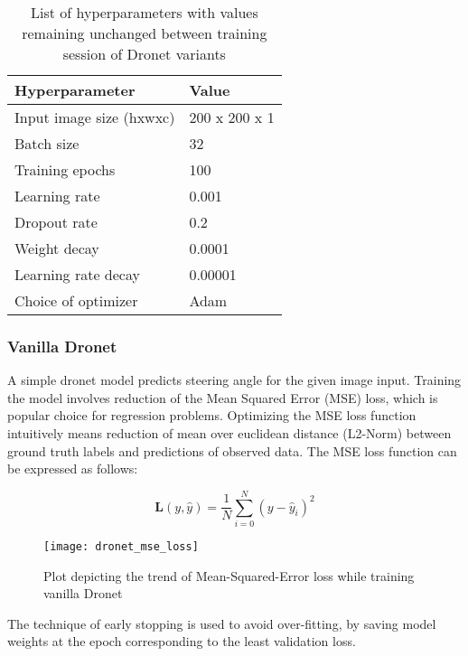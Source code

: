 \begin{table}[h]
	\centering
	\begin{tabular}{|l|l|}
		\hline
		\textbf{Hyperparameter} & \textbf{Value} \\ \hline
		Input image size (hxwxc)& 200 x 200 x 1  \\ \hline
		Batch size              & 32             \\ \hline
		Training epochs         & 100            \\ \hline
		Learning rate           & 0.001          \\ \hline
		Dropout rate            & 0.2            \\ \hline
		Weight decay            & 0.0001         \\ \hline
		Learning rate decay     & 0.00001        \\ \hline
		Choice of optimizer     & Adam           \\ \hline
	\end{tabular}
	\caption{List of hyperparameters with values remaining unchanged between training session of Dronet variants}	
\end{table}




\subsubsection{Vanilla Dronet}
A simple dronet model predicts steering angle for the given image input. Training the model involves reduction of the Mean Squared Error (MSE) loss, which is popular choice for regression problems. Optimizing the MSE loss function intuitively means reduction of mean over euclidean distance (L2-Norm) between ground truth labels and predictions of observed data. The MSE loss function can be expressed as follows:

\begin{equation}
	\mathbf{L}(y,\hat{y})=\frac{1}{N}\sum_{i=0}^{N}(y-\hat{y}_i)^2
\end{equation} 
\begin{figure}[h]
	\centering
	\texttt{[image: dronet\_mse\_loss]}
	\caption{Plot depicting the trend of Mean-Squared-Error loss while training vanilla Dronet}
	\label{fig_mse_loss_dronet}
\end{figure}

The technique of early stopping is used to avoid over-fitting, by saving model weights at the epoch corresponding to the least validation loss.

